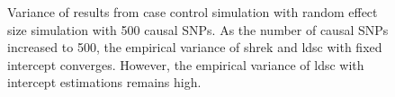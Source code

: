 \begin{figure}
{				
				\label{fig:ldscInCC500RandVar}
			}
			\caption[Variance of Case Control Simulation Results (500 Causal)]
			{Variance of results from case control simulation with random effect size simulation with 500 causal \glspl{SNP}.
				As the number of causal \glspl{SNP} increased to 500, the empirical variance of \gls{shrek} and \gls{ldsc} with fixed intercept converges. 
				However, the empirical variance of \gls{ldsc} with intercept estimations remains high. 
			} 
			\label{fig:CC500RandVar}
		\end{figure}
		
